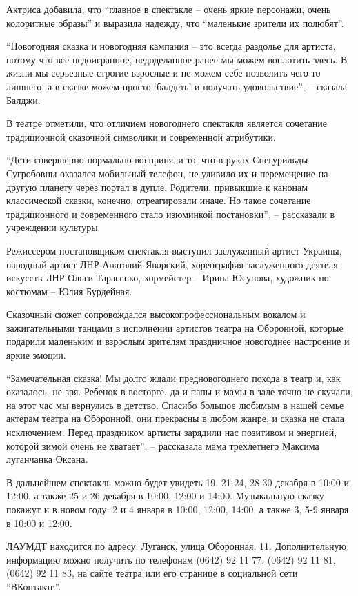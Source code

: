 Актриса добавила, что \enquote{главное в спектакле – очень яркие персонажи, очень
колоритные образы} и выразила надежду, что \enquote{маленькие зрители их полюбят}.

\enquote{Новогодняя сказка и новогодняя кампания – это всегда раздолье для артиста,
потому что все недоигранное, недоделанное ранее мы можем воплотить здесь. В
жизни мы серьезные строгие взрослые и не можем себе позволить чего-то лишнего,
а в сказке можем просто \enquote{балдеть} и получать удовольствие}, – сказала Балджи.

В театре отметили, что отличием новогоднего спектакля является сочетание
традиционной сказочной символики и современной атрибутики.

\enquote{Дети совершенно нормально восприняли то, что в руках Снегурильды Сугробовны
оказался мобильный телефон, не удивило их и перемещение на другую планету через
портал в дупле. Родители, привыкшие к канонам классической сказки, конечно,
отреагировали иначе. Но такое сочетание традиционного и современного стало
изюминкой постановки}, – рассказали в учреждении культуры.

Режиссером-постановщиком спектакля выступил заслуженный артист Украины,
народный артист ЛНР Анатолий Яворский, хореография заслуженного деятеля
искусств ЛНР Ольги Тарасенко, хормейстер – Ирина Юсупова, художник по костюмам
– Юлия Бурдейная.

Сказочный сюжет сопровождался высокопрофессиональным вокалом и зажигательными
танцами в исполнении артистов театра на Оборонной, которые подарили маленьким и
взрослым зрителям праздничное новогоднее настроение и яркие эмоции.

\enquote{Замечательная сказка! Мы долго ждали предновогоднего похода в театр и, как
оказалось, не зря. Ребенок в восторге, да и папы и мамы в зале точно не
скучали, на этот час мы вернулись в детство. Спасибо большое любимым в нашей
семье актерам театра на Оборонной, они прекрасны в любом жанре, и сказка не
стала исключением. Перед праздником артисты зарядили нас позитивом и энергией,
которой зимой очень не хватает}, – рассказала мама трехлетнего Максима
луганчанка Оксана.

В дальнейшем спектакль можно будет увидеть 19, 21-24, 28-30 декабря в 10:00 и
12:00, а также 25 и 26 декабря в 10:00, 12:00 и 14:00. Музыкальную сказку
покажут и в новом году: 2 и 4 января в 10:00, 12:00, 14:00, а также 3, 5-9
января в 10:00 и 12:00.

ЛАУМДТ находится по адресу: Луганск, улица Оборонная, 11. Дополнительную
информацию можно получить по телефонам (0642) 92 11 77, (0642) 92 11 81, (0642)
92 11 83, на сайте театра или его странице в социальной сети \enquote{ВКонтакте}.
